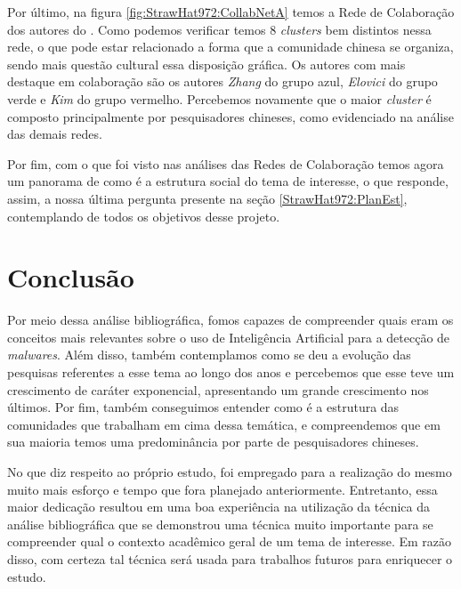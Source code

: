 Por último, na figura \ref{fig:StrawHat972:CollabNetA} temos a Rede de Colaboração dos autores do \dataset. Como podemos verificar temos 8 \textit{clusters} bem distintos nessa rede, o que pode estar relacionado a forma que a comunidade chinesa se organiza, sendo mais questão cultural essa disposição gráfica. Os autores com mais destaque em colaboração são os autores \textit{Zhang} do grupo azul, \textit{Elovici} do grupo verde e \textit{Kim} do grupo vermelho. Percebemos novamente que o maior \textit{cluster} é composto principalmente por pesquisadores chineses, como evidenciado na análise das demais redes.

Por fim, com o que foi visto nas análises das Redes de Colaboração temos agora um panorama de como é a estrutura social do tema de interesse, o que responde, assim, a nossa última pergunta presente na seção \ref{StrawHat972:PlanEst}, contemplando de todos os objetivos desse projeto.

\section{Conclusão}

Por meio dessa análise bibliográfica, fomos capazes de compreender quais eram os conceitos mais relevantes sobre o uso de Inteligência Artificial para a detecção de \textit{malwares}. Além disso, também contemplamos como se deu a evolução das pesquisas referentes a esse tema ao longo dos anos e percebemos que esse teve um crescimento de caráter exponencial, apresentando um grande crescimento nos últimos. Por fim, também conseguimos entender como é a estrutura das comunidades que trabalham em cima dessa temática, e compreendemos que em sua maioria temos uma predominância por parte de pesquisadores chineses.

No que diz respeito ao próprio estudo, foi empregado para a realização do mesmo muito mais esforço e tempo que fora planejado anteriormente. Entretanto, essa maior dedicação resultou em uma boa experiência na utilização da técnica da análise bibliográfica que se demonstrou uma técnica muito importante para se compreender qual o contexto acadêmico geral de um tema de interesse. Em razão disso, com certeza tal técnica será usada para trabalhos futuros para enriquecer o estudo.